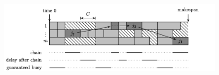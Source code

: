 	\begin{figure}
		\begin{center}
            \includegraphics[width=15cm]{chapters/scheduling1/graham_analysis}

\end{center}
\end{figure}

